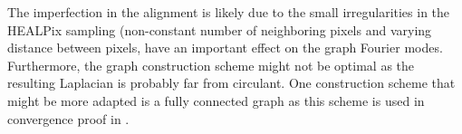 \documentclass{article} %
\newcommand{\figref}[1]{figure~\ref{fig:#1}}
\newcommand{\1}{\b{1}}              %
\newcommand{\0}{\b{0}}              %
\newcommand{\todo}[1]{{\color[rgb]{.6,.1,.6}{#1}}}
\begin{document}
The imperfection in the alignment is likely due to the small irregularities in the HEALPix sampling (non-constant number of neighboring pixels and varying distance between pixels, \todo{see \figref{healpix_graph_4})} have an important effect on the graph Fourier modes.
Furthermore, the graph construction scheme might not be optimal as the resulting Laplacian is probably far from circulant. One construction scheme that might be more adapted is a fully connected graph as this scheme is used in convergence proof in \cite{belkin2005towards,belkin2007convergence}.
\end{document}
